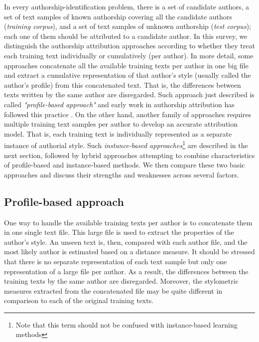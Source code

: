 In every authorship-identification problem, there is a set of candidate authors, a set of text samples of known authorship covering all the candidate authors (\textit{training corpus}), and a set of text samples of unknown authorship (\textit{test corpus}); each
one of them should be attributed to a candidate author. In this survey, we distinguish the authorship attribution approaches according to whether they treat each training text individually or cumulatively (per author). In more detail, some approaches concatenate all the available training texts per author in one big file and extract a cumulative representation of that author’s style (usually called the author’s profile) from
this concatenated text. That is, the differences between texts
written by the same author are disregarded. Such approach just described is called \textit{"profile-based approach"} and early work in authorship attribution has followed this practice \cite{mosteller2007inference}.
On the other hand, another family of approaches requires multiple training text samples per author to develop an accurate attribution model. That is, each training text is
individually represented as a separate instance of authorial style. Such \textit{instance-based approaches}\footnote{Note that this term should not be confused with instance-based learning methods\cite{mitchell1997artificial}} are described in the
next section, followed by hybrid approaches attempting to combine characteristics of profile-based and instance-based methods. We then compare these two basic approaches and
discuss their strengths and weaknesses across several factors.

\subsection{Profile-based approach}

One way to handle the available training texts per author is to concatenate them in one single text file. This large file is used to extract the properties of the author’s style. An unseen text is, then, compared with each author file, and the most likely author is estimated based on a distance measure. It should be stressed that there is no separate representation of each text sample but only one representation of a large file per author. As a result, the differences between the training texts by the same author are disregarded. Moreover, the stylometric measures extracted from the concatenated file may be quite
different in comparison to each of the original training texts.

